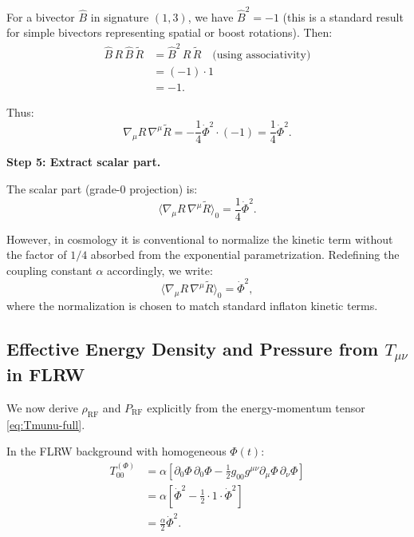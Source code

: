 \documentclass[11pt,a4paper]{article}
\numberwithin{equation}{section}
\theoremstyle{plain}
\theoremstyle{definition}
\theoremstyle{remark}
\begin{document}
For a bivector $\hat{B}$ in signature $(1,3)$, we have $\hat{B}^2 = -1$ (this is a standard result for simple bivectors representing spatial or boost rotations). Then:
\begin{align}
\hat{B}\,R\,\hat{B}\,\widetilde{R} &= \hat{B}^2\,R\,\widetilde{R}\quad\text{(using associativity)}\\
&= (-1)\cdot 1\\
&= -1.
\end{align}

Thus:
\begin{equation}
\nabla_\mu R\,\nabla^\mu \widetilde{R} = -\frac{1}{4}\dot{\Phi}^2 \cdot (-1) = \frac{1}{4}\dot{\Phi}^2.
\end{equation}

\textbf{Step 5: Extract scalar part.}

The scalar part (grade-0 projection) is:
\begin{equation}
\langle \nabla_\mu R\,\nabla^\mu \widetilde{R} \rangle_0 = \frac{1}{4}\dot{\Phi}^2.
\end{equation}

However, in cosmology it is conventional to normalize the kinetic term without the factor of $1/4$ absorbed from the exponential parametrization. Redefining the coupling constant $\alpha$ accordingly, we write:
\begin{equation}
\langle \nabla_\mu R\,\nabla^\mu \widetilde{R} \rangle_0 = \dot{\Phi}^2,
\label{eq:kinetic-reduction}
\end{equation}
where the normalization is chosen to match standard inflaton kinetic terms.

\subsection{Effective Energy Density and Pressure from $T_{\mu\nu}$ in FLRW}

We now derive $\rho_{\mathrm{RF}}$ and $P_{\mathrm{RF}}$ explicitly from the energy-momentum tensor \eqref{eq:Tmunu-full}.

In the FLRW background with homogeneous $\Phi(t)$:
\begin{align}
T_{00}^{(\Phi)} &= \alpha\left[\partial_0\Phi\,\partial_0\Phi - \frac{1}{2}g_{00}g^{\mu\nu}\partial_\mu\Phi\,\partial_\nu\Phi\right]\\
&= \alpha\left[\dot{\Phi}^2 - \frac{1}{2}\cdot 1\cdot \dot{\Phi}^2\right]\\
&= \frac{\alpha}{2}\dot{\Phi}^2.
\end{align}
\end{document}
